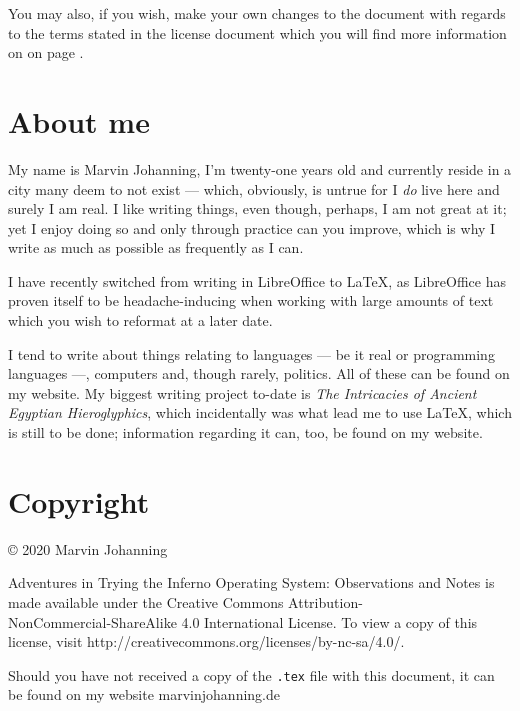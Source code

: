 \documentclass[a4paper,12pt]{report}
\begin{document}
You may also, if you wish, make your own changes to the document with regards to the terms stated in the license document which you will find more information on on page \pageref{copyright}.
\pagebreak

\chapter*{About me}

  My name is Marvin Johanning, I'm twenty-one years old and currently reside in a city many deem to not exist — which, obviously, is untrue for I \textit{do} live here and surely I am real. I like writing things, even though, perhaps, I am not great at it; yet I enjoy doing so and only through practice can you improve, which is why I write as much as possible as frequently as I can.

  I have recently switched from writing in LibreOffice to \LaTeX, as LibreOffice has proven itself to be headache-inducing when working with large amounts of text which you wish to reformat at a later date. 

  I tend to write about things relating to languages — be it real or programming languages —, computers and, though rarely, politics. All of these can be found on my website. My biggest writing project to-date is \textit{The Intricacies of Ancient Egyptian Hieroglyphics}, which incidentally was what lead me to use \LaTeX, which is still to be done; information regarding it can, too, be found on my website.


\chapter*{Copyright}
  \label{copyright}

\noindent
© 2020 Marvin Johanning

Adventures in Trying the Inferno Operating System: Observations and Notes is made available under the Creative Commons Attribution-\\NonCommercial-ShareAlike 4.0 International License. To view a copy of this license, visit http://creativecommons.org/licenses/by-nc-sa/4.0/.

Should you have not received a copy of the \texttt{.tex} file with this document, it can be found on my website marvinjohanning.de
\end{document}
